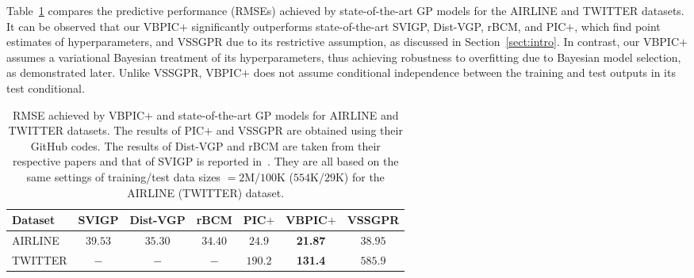 \documentclass[conference]{IEEEtran}
\begin{document}
Table~\ref{tab:exp} compares the predictive performance (RMSEs) achieved by state-of-the-art GP models for the AIRLINE and TWITTER datasets. 
It can be observed that our VBPIC$+$ significantly outperforms state-of-the-art SVIGP, Dist-VGP, rBCM, and PIC$+$, which find point estimates of hyperparameters, and VSSGPR due to its restrictive assumption, as discussed in Section~\ref{sect:intro}. In contrast, our VBPIC$+$ assumes a variational Bayesian treatment of its hyperparameters, thus achieving robustness to overfitting due to Bayesian model selection, as demonstrated later. Unlike VSSGPR, VBPIC$+$ does not assume conditional independence between the training and test outputs in its test conditional.
\begin{table}
\begin{small}	
\begin{tabular}{l|cccccc}
\hline
\hspace{-2.7mm} Dataset & \hspace{-2mm} SVIGP & \hspace{-3mm} Dist-VGP & \hspace{-3mm} rBCM & \hspace{-3mm} PIC$+$ & \hspace{-3.5mm} VBPIC$+$ & \hspace{-3.5mm} VSSGPR \hspace{-2.7mm} \\ 
\hline
\hspace{-2mm}AIRLINE & \hspace{-2mm} $39.53$ & \hspace{-3mm} $35.30$ & \hspace{-3.5mm} $34.40$ & \hspace{-3.5mm} $24.9$ & \hspace{-4mm} {\bf 21.87} & \hspace{-3.5mm} $38.95$\\ 
\hspace{-2mm}TWITTER\hspace{-2mm} & \hspace{-2mm} $-$ & \hspace{-3mm} $-$ & \hspace{-3.5mm} $-$ & \hspace{-3.5mm} $190.2$ & \hspace{-4mm} {\bf 131.4} & \hspace{-3.5mm} $585.9$\\
\hline
\end{tabular}
\end{small}
\caption{RMSE achieved by VBPIC$+$ and state-of-the-art GP models for AIRLINE and TWITTER datasets. The results of PIC$+$ and VSSGPR are obtained using their GitHub codes. The results of Dist-VGP and rBCM are taken from their respective papers and that of SVIGP is reported in~\cite{NghiaICML15}. They are all based on the same settings of training/test data sizes $= 2$M/$100$K ($554$K/$29$K) for the AIRLINE (TWITTER) dataset.}
\label{tab:exp}\vspace{-1mm}
\end{table}
\end{document}
